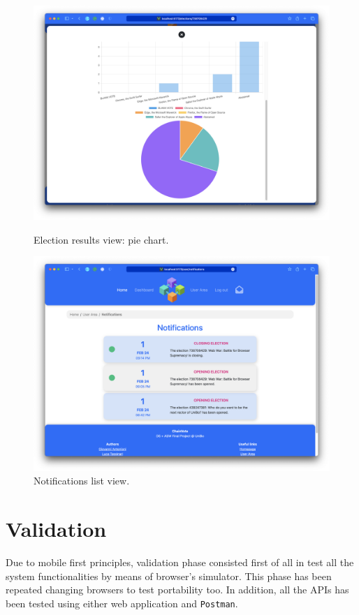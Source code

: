 \documentclass{scrartcl}
\begin{document}
\begin{figure}
    \centering
    \includegraphics[width=0.9\linewidth]{figures/story-board/14-results.png}
    \label{fig:results-2}
    \caption{Election results view: pie chart.}
\end{figure}

\begin{figure}
    \centering
    \includegraphics[width=0.9\linewidth]{figures/story-board/15-notifications.png}
    \caption{Notifications list view.}
    \label{fig:notifications-list}
\end{figure}
\restoregeometry

\section{Validation}

Due to mobile first principles, validation phase consisted first of all in test all the system functionalities by means of browser's simulator.
This phase has been repeated changing browsers to test portability too. In addition, all the APIs has been tested using either web application and \texttt{Postman}.
\end{document}
